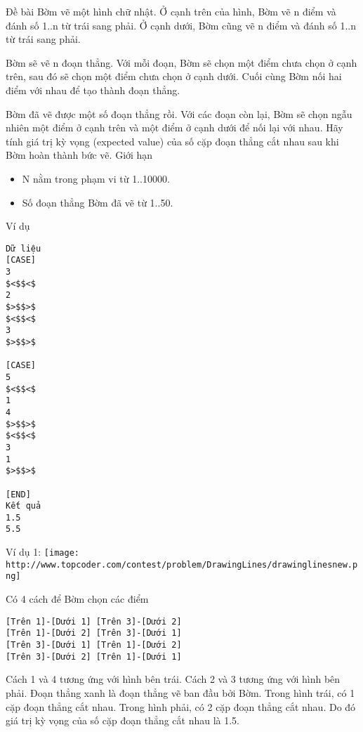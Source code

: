 Đề bài
Bờm vẽ một hình chữ nhật. Ở cạnh trên của hình, Bờm vẽ n điểm và đánh số 1..n từ trái sang phải. Ở cạnh dưới, Bờm cũng vẽ n điểm và đánh số 1..n từ trái sang phải.  

   Bờm sẽ vẽ n đoạn thẳng. Với mỗi đoạn, Bờm sẽ chọn một điểm chưa chọn ở cạnh trên, sau đó sẽ chọn một điểm chưa chọn ở cạnh dưới. Cuối cùng Bờm nối hai điểm với nhau để tạo thành đoạn thẳng.  

   Bờm đã vẽ được một số đoạn thẳng rồi. Với các đoạn còn lại, Bờm sẽ chọn ngẫu nhiên một điểm ở cạnh trên và một điểm ở cạnh dưới để nối lại với nhau. Hãy tính giá trị kỳ vọng (expected value) của số cặp đoạn thẳng cắt nhau sau khi Bờm hoàn thành bức vẽ.
Giới hạn
\begin{itemize}
	\item     N nằm trong phạm vi từ 1..10000.   
	\item     Số đoạn thẳng Bờm đã vẽ từ 1..50.   
\end{itemize}
Ví dụ
\begin{verbatim}
Dữ liệu
[CASE]
3
$<$$<$
2
$>$$>$
$<$$<$
3
$>$$>$

[CASE]
5
$<$$<$
1
4
$>$$>$
$<$$<$
3
1
$>$$>$

[END]
Kết quả
1.5
5.5
\end{verbatim}

   Ví dụ 1:  
\texttt{[image: http://www.topcoder.com/contest/problem/DrawingLines/drawinglinesnew.png]}

   Có 4 cách để Bờm chọn các điểm  
\begin{verbatim}
[Trên 1]-[Dưới 1] [Trên 3]-[Dưới 2]
[Trên 1]-[Dưới 2] [Trên 3]-[Dưới 1]
[Trên 3]-[Dưới 1] [Trên 1]-[Dưới 2]
[Trên 3]-[Dưới 2] [Trên 1]-[Dưới 1]
\end{verbatim}

   Cách 1 và 4 tương ứng với hình bên trái. Cách 2 và 3 tương ứng với hình bên phải. Đoạn thẳng xanh là đoạn thẳng vẽ ban đầu bởi Bờm. Trong hình trái, có 1 cặp đoạn thẳng cắt nhau. Trong hình phải, có 2 cặp đoạn thẳng cắt nhau. Do đó giá trị kỳ vọng của số cặp đoạn thẳng cắt nhau là 1.5.